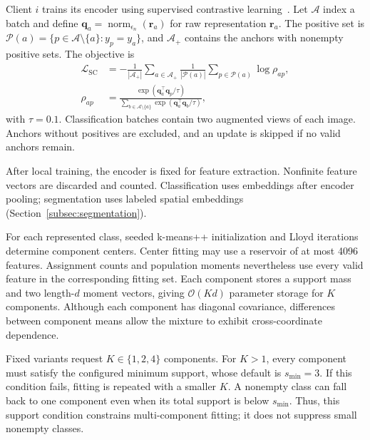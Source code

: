 Client $i$ trains its encoder using supervised
contrastive learning~\cite{khosla2020supervised}.
Let $\mathcal A$ index a batch and define
$\bm q_a=\operatorname{norm}_{\epsilon_n}(\bm r_a)$
for raw representation $\bm r_a$.
The positive set is
$\mathcal P(a)=
\{p\in\mathcal A\setminus\{a\}:y_p=y_a\}$,
and $\mathcal A_+$ contains the anchors with
nonempty positive sets.
The objective is
\begin{equation}
\label{eq:supervised_contrastive}
\begin{aligned}
\mathcal L_{\mathrm{SC}}
&=
-\frac{1}{|\mathcal A_+|}
\sum_{a\in\mathcal A_+}
\frac{1}{|\mathcal P(a)|}
\sum_{p\in\mathcal P(a)}
\log\rho_{ap},\\
\rho_{ap}
&=
\frac{\exp(\bm q_a^\top\bm q_p/\tau)}
{\sum_{b\in\mathcal A\setminus\{a\}}
 \exp(\bm q_a^\top\bm q_b/\tau)},
\end{aligned}
\end{equation}
with $\tau=0.1$.
Classification batches contain two augmented views
of each image.
Anchors without positives are excluded, and an update
is skipped if no valid anchors remain.

After local training, the encoder is fixed for feature
extraction.
Nonfinite feature vectors are discarded and counted.
Classification uses embeddings after encoder pooling;
segmentation uses labeled spatial embeddings
(Section~\ref{subsec:segmentation}).

For each represented class, seeded k-means++
initialization and Lloyd iterations determine
component centers.
Center fitting may use a reservoir of at most
4096 features.
Assignment counts and population moments nevertheless
use every valid feature in the corresponding fitting set.
Each component stores a support mass and two
length-$d$ moment vectors, giving
$\mathcal O(Kd)$ parameter storage for $K$ components.
Although each component has diagonal covariance,
differences between component means allow the mixture
to exhibit cross-coordinate dependence.

Fixed variants request $K\in\{1,2,4\}$ components.
For $K>1$, every component must satisfy the configured
minimum support, whose default is $s_{\min}=3$.
If this condition fails, fitting is repeated with
a smaller $K$.
A nonempty class can fall back to one component even
when its total support is below $s_{\min}$.
Thus, this support condition constrains multi-component
fitting; it does not suppress small nonempty classes.

